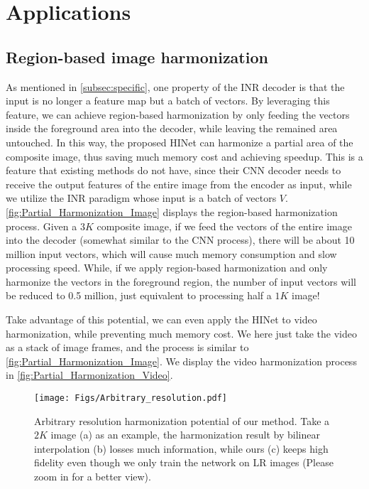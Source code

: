 \documentclass[10pt,journal,twocolumn,twoside]{IEEEtran}
\begin{document}
\section{Applications}
\label{sec:usage}

\subsection{Region-based image harmonization}
As mentioned in \cref{subsec:specific}, one property of the INR decoder is that the input is no longer a feature map but a batch of vectors. By leveraging this feature, we can achieve region-based harmonization by only feeding the vectors inside the foreground area into the decoder, while leaving the remained area untouched. In this way, the proposed HINet can harmonize a partial area of the composite image, thus saving much memory cost and achieving speedup. This is a feature that existing methods\cite{cong2022high, sofiiuk2021foreground, hang2022scs} do not have, since their CNN decoder needs to receive the output features of the entire image from the encoder as input, while we utilize the INR paradigm whose input is a batch of vectors $V$. \cref{fig:Partial_Harmonization_Image} displays the region-based harmonization process. Given a $3K$ composite image, if we feed the vectors of the entire image into the decoder (somewhat similar to the CNN process), there will be about 10 million input vectors, which will cause much memory consumption and slow processing speed. While, if we apply region-based harmonization and only harmonize the vectors in the foreground region, the number of input vectors will be reduced to 0.5 million, just equivalent to processing half a $1K$ image!

Take advantage of this potential, we can even apply the HINet to video harmonization, while preventing much memory cost. We here just take the video as a stack of image frames, and the process is similar to \cref{fig:Partial_Harmonization_Image}. We display the video harmonization process in \cref{fig:Partial_Harmonization_Video}.


\begin{figure}[t]
  \centering
   \texttt{[image: Figs/Arbitrary\_resolution.pdf]}
   \caption{Arbitrary resolution harmonization potential of our method. Take a $2K$ image (a) as an example, the harmonization result by bilinear interpolation (b) losses much information, while ours (c) keeps high fidelity even though we only train the network on LR images (Please zoom in for a better view).}
   \label{fig:Arbitrary_resolution}
\end{figure}
\end{document}
